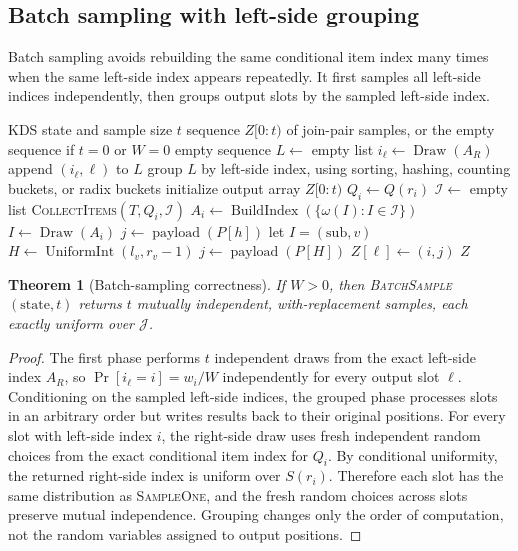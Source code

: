 \documentclass[11pt]{article}
\theoremstyle{definition}
\theoremstyle{plain}
\newtheorem{theorem}{Theorem}[section]
\theoremstyle{remark}
\DeclareMathOperator{\UniformInt}{UniformInt}
\DeclareMathOperator{\BuildIndex}{BuildIndex}
\DeclareMathOperator{\Draw}{Draw}
\DeclareMathOperator{\payload}{payload}
\newcommand{\Jset}{\mathcal J}
\newcommand{\Items}{\mathcal I}
\newcommand{\pt}{\mathrm{pt}}
\newcommand{\sub}{\mathrm{sub}}
\begin{document}
\subsection{Batch sampling with left-side grouping}

Batch sampling avoids rebuilding the same conditional item index many times when the same
left-side index appears repeatedly.  It first samples all left-side indices independently,
then groups output slots by the sampled left-side index.

\begin{algorithm}[htbp]
\caption{\textsc{BatchSample}$(\mathrm{state},t)$}
\begin{algorithmic}[1]
\Require KDS state and sample size $t$
\Ensure sequence $Z[0:t)$ of join-pair samples, or the empty sequence if $t=0$ or $W=0$
  \State \Return empty sequence
\EndIf
\State $L\gets$ empty list
  \State $i_\ell\gets\Draw(A_R)$
  \State append $(i_\ell,\ell)$ to $L$
\EndFor
\State group $L$ by left-side index, using sorting, hashing, counting buckets, or radix buckets
\State initialize output array $Z[0:t)$
  \State $Q_i\gets Q(r_i)$
  \State $\Items\gets$ empty list
  \State \textsc{CollectItems}$(T,Q_i,\Items)$
  \State $A_i\gets\BuildIndex(\{\omega(I):I\in\Items\})$
    \State $I\gets\Draw(A_i)$
    \If{$I=(\pt,h)$}
      \State $j\gets\payload(P[h])$
    \Else
      \State let $I=(\sub,v)$
      \State $H\gets\UniformInt(l_v,r_v-1)$
      \State $j\gets\payload(P[H])$
    \EndIf
    \State $Z[\ell]\gets(i,j)$
  \EndFor
\EndFor
\State \Return $Z$
\end{algorithmic}
\end{algorithm}

\begin{theorem}[Batch-sampling correctness]
If $W>0$, then \textsc{BatchSample}$(\mathrm{state},t)$ returns $t$ mutually independent,
with-replacement samples, each exactly uniform over $\Jset$.
\end{theorem}

\begin{proof}
The first phase performs $t$ independent draws from the exact left-side index $A_R$, so
$\Pr[i_\ell=i]=w_i/W$ independently for every output slot $\ell$.  Conditioning on the
sampled left-side indices, the grouped phase processes slots in an arbitrary order but writes
results back to their original positions.  For every slot with left-side index $i$, the
right-side draw uses fresh independent random choices from the exact conditional item index
for $Q_i$.  By conditional uniformity, the returned right-side index is uniform over
$S(r_i)$.  Therefore each slot has the same distribution as \textsc{SampleOne}, and the
fresh random choices across slots preserve mutual independence.  Grouping changes only the
order of computation, not the random variables assigned to output positions.
\end{proof}
\end{document}
